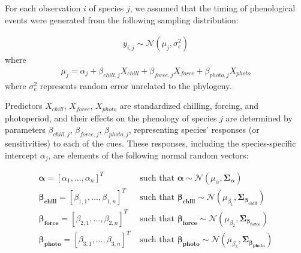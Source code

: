 \documentclass[11pt]{article}
\begin{document}
For each observation $i$ of species $j$, we assumed that the timing of phenological events were generated from the following sampling distribution:

\begin{align}
  \label{modely}
  y_{i,j} \sim \mathcal{N}(\mu_j, \sigma_e^2)
\end{align}
where
\begin{align}
  \label{modelmu}
  \mu_j = \alpha_j + \beta_{chill,j} X_{chill} + \beta_{force,j} X_{force} + \beta_{photo,j} X_{photo}
\end{align}
where $\sigma_e^2$ represents random error unrelated to the phylogeny. 

Predictors $X_{chill}$, $X_{force}$, $X_{photo}$ are standardized chilling, forcing, and photoperiod, and their effects on the phenology of species $j$ are determined by parameters $\beta_{chill,j}$, $\beta_{force,j}$, $\beta_{photo,j}$, representing species' responses (or sensitivities) to each of the cues. These responses, including the species-specific intercept $\alpha_j$, are elements of the following normal random vectors:

\begin{align}
    \label{phybetas}
  \boldsymbol{\alpha} = [\alpha_1, \ldots, \alpha_n]^T & \text{ such that }
  \boldsymbol{\alpha} \sim \mathcal{N}(\mu_{\alpha},\boldsymbol{\Sigma_{\alpha}}) \\
  \boldsymbol{\beta_{chill}} =  [\beta_{1,1}, \ldots, \beta_{1,n}]^T & \text{ such that }
  \boldsymbol{\beta_{chill}} \sim \mathcal{N}(\mu_{\beta_1},\boldsymbol{\Sigma_{\beta_{chill}}}) \nonumber \\
  \boldsymbol{\beta_{force}} =  [\beta_{2,1}, \ldots, \beta_{2,n}]^T & \text{ such that }
  \boldsymbol{\beta_{force}} \sim \mathcal{N}(\mu_{\beta_2},\boldsymbol{\Sigma_{\beta_{force}}}) \nonumber \\
  \boldsymbol{\beta_{photo}} =  [\beta_{3,1}, \ldots, \beta_{3,n}]^T & \text{ such that }
  \boldsymbol{\beta_{photo}} \sim \mathcal{N}(\mu_{\beta_3},\boldsymbol{\Sigma_{\beta_{photo}}}) \nonumber
\end{align}
\end{document}
